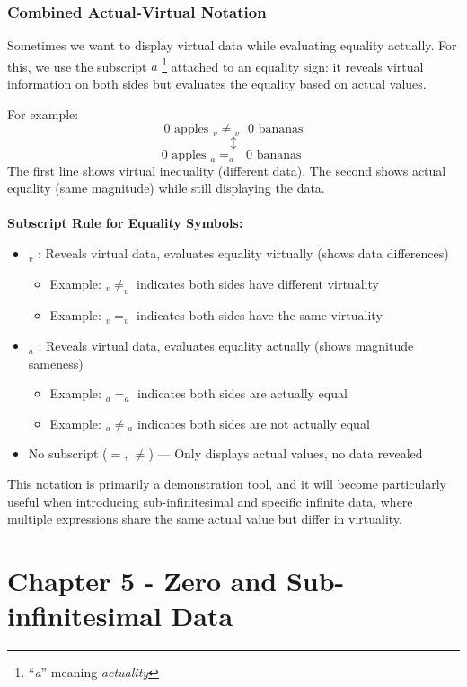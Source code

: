 \documentclass{article}
\begin{document}
\subsubsection{Combined Actual-Virtual Notation}

Sometimes we want to display virtual data while evaluating equality actually. For this, we use the subscript $a$ \footnote{``\textit{a}'' meaning \textit{actuality}} attached to an equality sign: it reveals virtual information on both sides but evaluates the equality based on actual values.

For example:
$$0 \text{ apples } {}_v{\neq}{}_v \text{ } 0\text{ bananas}$$
$$\updownarrow$$
$$0 \text{ apples } {}_a{=}_a \text{ }0\text{ bananas }$$ The first line shows virtual inequality (different data). The second shows actual equality (same magnitude) while still displaying the data.\\\\\textbf{Subscript Rule for Equality Symbols:}
\begin{itemize}
\item ${}_v$ : Reveals virtual data, evaluates equality virtually (shows data differences)
\begin{itemize}
\item Example: ${}_v{\neq}_v$ indicates both sides have different virtuality
\item Example: ${}_v{=}_v$ indicates both sides have the same virtuality
\end{itemize}

\item ${}_a$ : Reveals virtual data, evaluates equality actually (shows magnitude sameness)
\begin{itemize}
\item Example: ${}_a{=}_a$ indicates both sides are actually equal
\item Example: ${}_a{\neq}{}_a$ indicates both sides are not actually equal
\end{itemize}
\item No subscript ($=$, $\neq$) — Only displays actual values, no data revealed
\end{itemize}This notation is primarily a demonstration tool, and it will become particularly useful when introducing sub-infinitesimal and specific infinite data, where multiple expressions share the same actual value but differ in virtuality.
\newpage
\section{Chapter 5 - Zero and Sub-infinitesimal Data}
\end{document}
